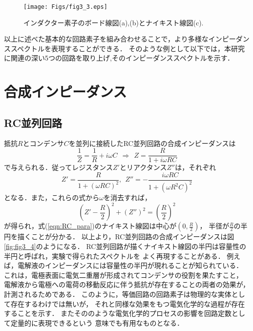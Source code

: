 \begin{figure}[h]
	\begin{center}
	\texttt{[image: Figs/fig3\_3.eps]} 
	\end{center}
	\caption{
		インダクター素子のボード線図(a),(b)とナイキスト線図(c).
	} 
	\label{fig:fig3_3}
\end{figure}
以上に述べた基本的な回路素子を組み合わせることで，より多様なインピーダンススペクトルを表現することができる．
そのような例として以下では，本研究に関連の深い5つの回路を取り上げ,そのインピーダンススペクトルを示す．
\section{合成インピーダンス}
\subsection{RC並列回路}
抵抗$R$とコンデンサ$C$を並列に接続したRC並列回路の合成インピーダンスは
\begin{equation}
	\frac{1}{Z}=\frac{1}{R} + i\omega C \ \ 
	\Rightarrow \ \ Z =\frac{R}{1+i\omega RC}
	\label{eqn:RC_para}
\end{equation}
で与えられる．従ってレジスタンス$Z'$とリアクタンス$Z''$は，それぞれ
\begin{equation}
	Z'=\frac{R}{1+(\omega RC)^2}, \ \ 
	Z''=-\frac{i\omega RC}{1+(\omega R^2C)^2} 
	\label{eqn:}
\end{equation}
となる．また，これらの式から$\omega$を消去すれば，
\begin{equation}
	\left( Z'-\frac{R}{2}\right)^2 +\left(Z''\right)^2 =\left( \frac{R}{2}\right)^2
	\label{eqn:}
\end{equation}
が得られ，式(\ref{eqn:RC_para})のナイキスト線図は中心が$\left( 0, \frac{R}{2}\right)$，
半径が$\frac{R}{2}$の半円を描くことが分かる．
以上より，RC並列回路の合成インピーダンスは図\ref{fig:fig3_4}のようになる．
RC並列回路が描くナイキスト線図の半円は容量性の半円と呼ばれ，実験で得られたスペクトルを
よく再現することがある．
例えば，電解液のインピーダンスには容量性の半円が現れることが知られている．
これは，電極表面に電気二重層が形成されてコンデンサの役割を果たすこと，
電解液から電極への電荷の移動反応に伴う抵抗が存在することの両者の効果が，
計測されるためである．
このように，等価回路の回路素子は物理的な実体として存在するわけでは無いが，
それと同様な効果をもつ電気化学的な過程が存在することを示す．
またそののような電気化学的プロセスの影響を回路定数として定量的に表現できるという
意味でも有用なものとなる．
